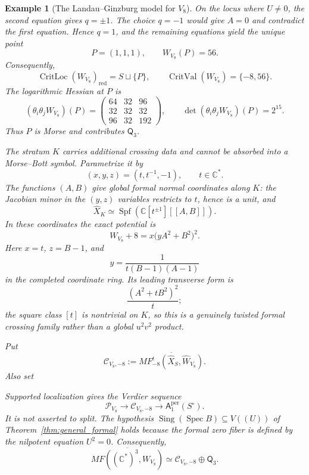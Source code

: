 \documentclass[11pt]{amsart}
\newtheorem{example}{Example}[section]
\DeclareMathOperator{\Sing}{Sing}
\DeclareMathOperator{\CritVal}{CritVal}
\DeclareMathOperator{\CritLoc}{CritLoc}
\newcommand{\MorseCat}[1]{\mathsf{Q}_{#1}}
\newcommand{\Aper}[2]{\mathsf{A}^{\mathrm{per}}_{#2}(#1)}
\newcommand{\fitdisplay}[1]{%
  \begin{center}%
  \resizebox{\textwidth}{!}{$\displaystyle #1$}%
  \end{center}%
}
\begin{document}
\begin{example}[The Landau--Ginzburg model for $V_8$]
On the locus where $U\neq0$, the second equation gives $q=\pm1$. The choice
$q=-1$ would give $A=0$ and contradict the first equation. Hence $q=1$, and
the remaining equations yield the unique point
\[
P=(1,1,1),
\qquad
W_{V_8}(P)=56.
\]
Consequently,
\[
\CritLoc(W_{V_8})_{\mathrm{red}}=S\sqcup\{P\},
\qquad
\CritVal(W_{V_8})=\{-8,56\}.
\]
The logarithmic Hessian at $P$ is
\[
(\theta_i\theta_jW_{V_8})(P)=
\begin{pmatrix}
64&32&96\\
32&32&32\\
96&32&192
\end{pmatrix},
\qquad
\det(\theta_i\theta_jW_{V_8})(P)=2^{15}.
\]
Thus $P$ is Morse and contributes $\MorseCat{3}$.

The stratum $K$ carries additional crossing data and cannot be absorbed into a
Morse--Bott symbol. Parametrize it by
\[
(x,y,z)=\left(t,t^{-1},-1\right),
\qquad t\in\mathbb C^*.
\]
The functions $(A,B)$ give global formal normal coordinates along $K$: the
Jacobian minor in the $(y,z)$ variables restricts to $t$, hence is a unit, and
\[
\widehat X_K
\simeq
\operatorname{Spf}\!\left(\mathbb C[t^{\pm1}][[A,B]]\right).
\]
In these coordinates the exact potential is
\[
W_{V_8}+8
=x\bigl(yA^2+B^2\bigr)^2.
\]
Here $x=t$, $z=B-1$, and
\[
y=\frac{1}{t(B-1)(A-1)}
\]
in the completed coordinate ring. Its leading transverse form is
\[
\frac{(A^2+tB^2)^2}{t};
\]
the square class $[t]$ is nontrivial on $K$, so this is a genuinely twisted
formal crossing family rather than a global $u^2v^2$ product.

Put
\[
\mathcal C_{V_8,-8}
:=
\overline{MF^t_{-8}(\widehat X_S,\widehat W_{V_8})}.
\]
Also set
\fitdisplay{\mathcal P_{V_8}:=
\overline{MF^t_0\!\left(
\operatorname{Spf}\mathbb C[t^{\pm1}][[A,B]],
t\left(\frac{A^2}{t(B-1)(A-1)}+B^2\right)^2
\right)}}
Supported localization gives the Verdier sequence
\[
\mathcal P_{V_8}
\longrightarrow
\mathcal C_{V_8,-8}
\longrightarrow
\Aper{S^\circ}{1}.
\]
It is not asserted to split. The hypothesis
$\Sing(\operatorname{Spec}B)\subseteq V((U))$ of
Theorem~\ref{thm:general_formal} holds because the formal zero fiber is defined
by the nilpotent equation $U^2=0$. Consequently,
\[
\overline{MF((\mathbb{C}^*)^3,W_{V_8})}
\simeq
\mathcal C_{V_8,-8}\oplus\MorseCat{3}.
\]

\end{example}
\end{document}
